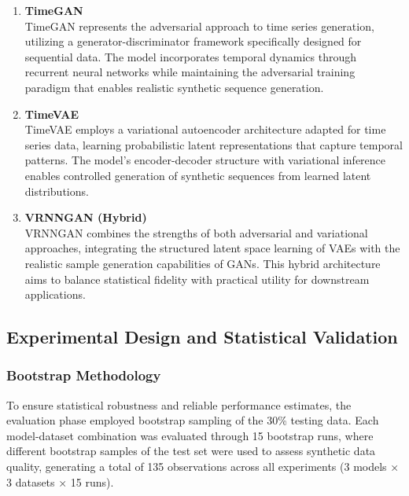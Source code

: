 \documentclass{article}
\begin{document}
\begin{enumerate}
    \item \textbf{TimeGAN}\\
    TimeGAN \parencite{yoon_time-series_2019} represents the adversarial approach to time series generation, utilizing a generator-discriminator framework specifically designed for sequential data. The model incorporates temporal dynamics through recurrent neural networks while maintaining the adversarial training paradigm that enables realistic synthetic sequence generation.

    \item \textbf{TimeVAE}\\
    TimeVAE \parencite{desai_timevae_2021} employs a variational autoencoder architecture adapted for time series data, learning probabilistic latent representations that capture temporal patterns. The model's encoder-decoder structure with variational inference enables controlled generation of synthetic sequences from learned latent distributions.

    \item \textbf{VRNNGAN (Hybrid)}\\
    VRNNGAN \parencite{lee_vrnngan_2022} combines the strengths of both adversarial and variational approaches, integrating the structured latent space learning of VAEs with the realistic sample generation capabilities of GANs. This hybrid architecture aims to balance statistical fidelity with practical utility for downstream applications.
\end{enumerate}

\subsection{Experimental Design and Statistical Validation}

\subsubsection{Bootstrap Methodology}
To ensure statistical robustness and reliable performance estimates, the evaluation phase employed bootstrap sampling of the 30\% testing data. Each model-dataset combination was evaluated through 15 bootstrap runs, where different bootstrap samples of the test set were used to assess synthetic data quality, generating a total of 135 observations across all experiments (3 models × 3 datasets × 15 runs).
\end{document}
